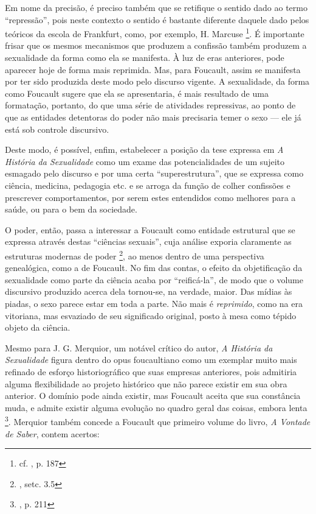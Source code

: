 \documentclass[12pt,a4paper]{article}
\begin{document}
	Em nome da precisão, é preciso também que se retifique o sentido dado 
	ao termo ``repressão'', pois neste contexto o sentido é bastante diferente 
	daquele dado pelos teóricos da escola de Frankfurt, como, por exemplo, 
	H. Marcuse 
		\footnote{cf. \cite{merquior}, p. 187}. 
	É importante frisar que os mesmos mecanismos que produzem a confissão 
	também produzem a sexualidade da forma como ela se manifesta. À luz de 
	eras anteriores, pode aparecer hoje de forma mais reprimida. Mas, para 
	Foucault, assim se manifesta por ter sido produzida deste modo pelo 
	discurso vigente. A sexualidade, da forma como Foucault sugere que ela 
	se apresentaria, é mais resultado de uma formatação, portanto, do que 
	uma série de atividades repressivas, ao ponto de que as entidades 
	detentoras do poder não mais precisaria temer o sexo --- ele já está 
	sob controle discursivo. 
	
	Deste modo, é possível, enfim, estabelecer a posição da tese expressa 
	em \textit{A História da Sexualidade} como um exame das potencialidades 
	de um sujeito esmagado pelo discurso e por uma certa ``superestrutura'', 
	que se expressa como ciência, medicina, pedagogia etc. e se arroga da 
	função de colher confissões e prescrever comportamentos, por serem estes 
	entendidos como melhores para a saúde, ou para o bem da sociedade. 
	
	O poder, então, passa a interessar a Foucault como entidade estrutural 
	que se expressa através destas ``ciências sexuais'', cuja análise exporia 
	claramente as estruturas modernas de poder 	
	\footnote{\cite{sep}, setc. 3.5}, 
	ao menos dentro de uma perspectiva genealógica, como a de Foucault. 
	No fim das contas, o efeito da objetificação da sexualidade como parte da 
	ciência acaba por ``reificá-la'', de modo que o volume discursivo 
	produzido acerca dela tornou-se, na verdade, maior. Das mídias às piadas, 
	o sexo parece estar em toda a parte. Não mais é \textit{reprimido}, como 
	na era vitoriana, mas esvaziado de seu significado original, posto à 
	mesa como tépido objeto da ciência. 
	
	Mesmo para J. G. Merquior, um notável crítico do autor, 
	\textit{A História da Sexualidade} figura dentro 
	do opus foucaultiano como um exemplar muito mais refinado de esforço 
	historiográfico que suas empresas anteriores, pois admitiria alguma 
	flexibilidade ao projeto histórico que não parece existir em sua obra 
	anterior. O domínio pode ainda existir, mas Foucault aceita que sua 
	constância muda, e admite existir alguma evolução no quadro geral das 
	coisas, embora lenta
	\footnote{\cite{merquior}, p. 211}. 
	Merquior também concede a Foucault que primeiro volume do livro, 
	\textit{A Vontade de Saber}, contem acertos: 
	
\end{document}
